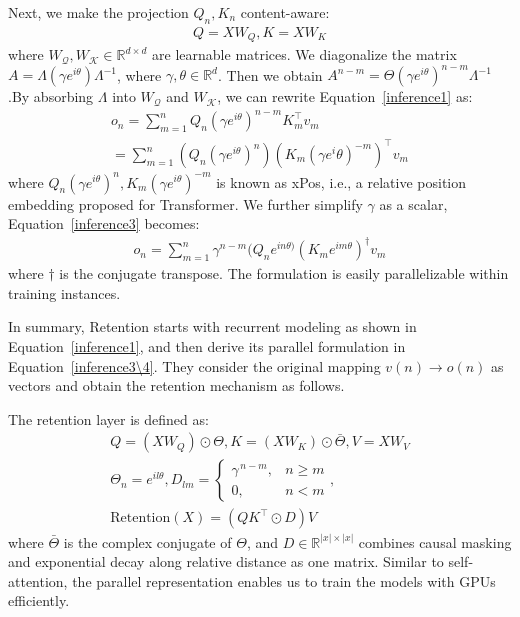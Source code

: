 \documentclass[11pt]{article}
\begin{document}
Next, we make the projection $Q_n, K_n$ content-aware:
\begin{equation} \label{inference2}
\begin{split}
Q=XW_Q, K=XW_K
\end{split}
\end{equation}
where $W_{\mathcal{Q}}, W_{\mathcal{K}} \in \mathbb{R}^{d\times d}$ are learnable matrices.
We diagonalize the matrix $A=\Lambda(\gamma e^{i\theta})\Lambda^{-1}$, where $\gamma,\theta \in \mathbb{R}^d$. Then we obtain $A^{n-m}= \Theta(\gamma e^{i\theta})^{n-m}\Lambda^{-1}$.By absorbing $\Lambda$ into $W_{\mathcal{Q}}$ and $W_{\mathcal{K}}$, we can rewrite Equation~\ref{inference1} as:
\begin{equation} \label{inference3}
\begin{split}
o_n = \sum^n_{m=1}Q_n(\gamma e^{i\theta})^{n-m}K^\top_mv_m\\
=\sum^n_{m=1}(Q_n(\gamma e^{i\theta})^n)(K_m(\gamma e^i\theta)^{-m})^\top v_m
\end{split}
\end{equation}
where $Q_n(\gamma e^{i\theta})^n, K_m(\gamma e^{i\theta})^{-m}$ is known as xPos, i.e., a relative position embedding
proposed for Transformer. We further simplify $\gamma$ as a scalar, Equation~\ref{inference3} becomes:
\begin{equation} \label{inference4}
\begin{split}
o_n = \sum^n_{m=1}\gamma^{n-m}(Q_n e^{in\theta)}(K_m e^{im\theta})^{\dagger}v_m
\end{split}
\end{equation}
where $\dagger$ is the conjugate transpose. The formulation is easily parallelizable within training instances. 

In summary, Retention starts with recurrent modeling as shown in Equation~\ref{inference1}, and then derive its parallel formulation in Equation~\ref{inference3\4}. They consider the original mapping $v(n) \rightarrow o(n)$ as vectors and obtain the retention mechanism as follows.

The retention layer is defined as:
\begin{equation} \label{inference5}
\begin{split}
Q=(XW_Q)\odot \Theta, K=(XW_K)\odot \bar{\Theta}, V=XW_V \\
\Theta_n = e^{il\theta}, D_{lm}= 
\begin{cases}
\gamma^{\,n-m}, & n \ge m \\
0, & n < m
\end{cases}
, \\ \text{Retention}(X)=(QK^\top \odot D)V
\end{split}
\end{equation}
where $\bar{\Theta}$ is the complex conjugate of $\Theta$, and $D \in \mathbb{R}^{|x| \times |x|}$ combines causal masking and exponential decay along relative distance as one matrix. Similar to self-attention, the parallel representation enables us to train the models with GPUs efficiently.
\end{document}
